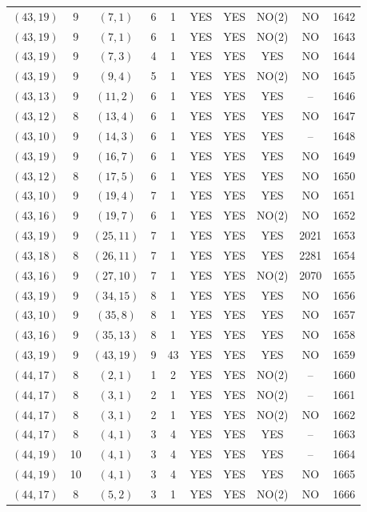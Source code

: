 \begin{longtable}{|c|c|c|c|c|c|c|c|c|c|}
$(43, 19)$ & 9 & $(7, 1)$ & 6 & 1 & YES & YES & NO(2) & NO & 1642\\
$(43, 19)$ & 9 & $(7, 1)$ & 6 & 1 & YES & YES & NO(2) & NO & 1643\\
$(43, 19)$ & 9 & $(7, 3)$ & 4 & 1 & YES & YES & YES & NO & 1644\\
$(43, 19)$ & 9 & $(9, 4)$ & 5 & 1 & YES & YES & NO(2) & NO & 1645\\
$(43, 13)$ & 9 & $(11, 2)$ & 6 & 1 & YES & YES & YES & -- & 1646\\
$(43, 12)$ & 8 & $(13, 4)$ & 6 & 1 & YES & YES & YES & NO & 1647\\
$(43, 10)$ & 9 & $(14, 3)$ & 6 & 1 & YES & YES & YES & -- & 1648\\
$(43, 19)$ & 9 & $(16, 7)$ & 6 & 1 & YES & YES & YES & NO & 1649\\
$(43, 12)$ & 8 & $(17, 5)$ & 6 & 1 & YES & YES & YES & NO & 1650\\
$(43, 10)$ & 9 & $(19, 4)$ & 7 & 1 & YES & YES & YES & NO & 1651\\
$(43, 16)$ & 9 & $(19, 7)$ & 6 & 1 & YES & YES & NO(2) & NO & 1652\\
$(43, 19)$ & 9 & $(25, 11)$ & 7 & 1 & YES & YES & YES & 2021 & 1653\\
$(43, 18)$ & 8 & $(26, 11)$ & 7 & 1 & YES & YES & YES & 2281 & 1654\\
$(43, 16)$ & 9 & $(27, 10)$ & 7 & 1 & YES & YES & NO(2) & 2070 & 1655\\
$(43, 19)$ & 9 & $(34, 15)$ & 8 & 1 & YES & YES & YES & NO & 1656\\
$(43, 10)$ & 9 & $(35, 8)$ & 8 & 1 & YES & YES & YES & NO & 1657\\
$(43, 16)$ & 9 & $(35, 13)$ & 8 & 1 & YES & YES & YES & NO & 1658\\
$(43, 19)$ & 9 & $(43, 19)$ & 9 & 43 & YES & YES & YES & NO & 1659\\
$(44, 17)$ & 8 & $(2, 1)$ & 1 & 2 & YES & YES & NO(2) & -- & 1660\\
$(44, 17)$ & 8 & $(3, 1)$ & 2 & 1 & YES & YES & NO(2) & -- & 1661\\
$(44, 17)$ & 8 & $(3, 1)$ & 2 & 1 & YES & YES & NO(2) & NO & 1662\\
$(44, 17)$ & 8 & $(4, 1)$ & 3 & 4 & YES & YES & YES & -- & 1663\\
$(44, 19)$ & 10 & $(4, 1)$ & 3 & 4 & YES & YES & YES & -- & 1664\\
$(44, 19)$ & 10 & $(4, 1)$ & 3 & 4 & YES & YES & YES & NO & 1665\\
$(44, 17)$ & 8 & $(5, 2)$ & 3 & 1 & YES & YES & NO(2) & NO & 1666\\

\end{longtable}
